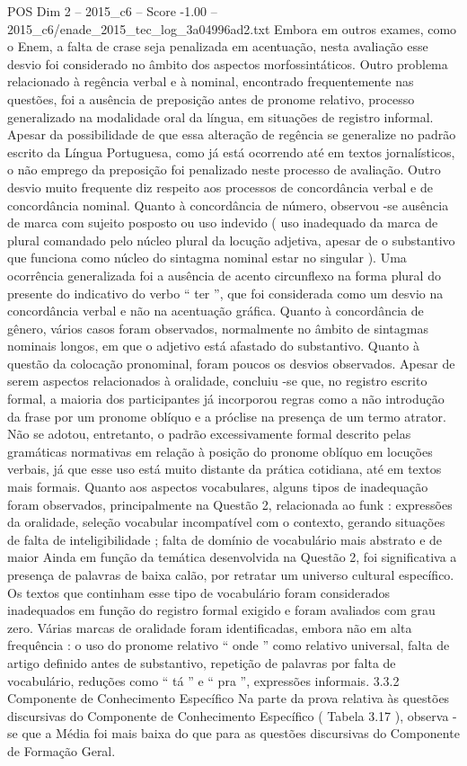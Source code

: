 \begin{textsample}{POS Dim 2 – 2015\_c6 – Score -1.00 – 2015\_c6/enade\_2015\_tec\_log\_3a04996ad2.txt}
Embora em outros exames, como o Enem, a falta de crase seja penalizada em acentuação, nesta avaliação esse desvio foi considerado no âmbito dos aspectos morfossintáticos.
Outro problema relacionado à regência verbal e à nominal, encontrado frequentemente nas questões, foi a ausência de preposição antes de pronome relativo, processo generalizado na modalidade oral da língua, em situações de registro informal.
Apesar da possibilidade de que essa alteração de regência se generalize no padrão escrito da Língua Portuguesa, como já está ocorrendo até em textos jornalísticos, o não emprego da preposição foi penalizado neste processo de avaliação.
Outro desvio muito frequente diz respeito aos processos de concordância verbal e de concordância nominal.
Quanto à concordância de número, observou -se ausência de marca com sujeito posposto ou uso indevido ( uso inadequado da marca de plural comandado pelo núcleo plural da locução adjetiva, apesar de o substantivo que funciona como núcleo do sintagma nominal estar no singular ).
Uma ocorrência generalizada foi a ausência de acento circunflexo na forma plural do presente do indicativo do verbo “ ter ”, que foi considerada como um desvio na concordância verbal e não na acentuação gráfica.
Quanto à concordância de gênero, vários casos foram observados, normalmente no âmbito de sintagmas nominais longos, em que o adjetivo está afastado do substantivo.
Quanto à questão da colocação pronominal, foram poucos os desvios observados.
Apesar de serem aspectos relacionados à oralidade, concluiu -se que, no registro escrito formal, a maioria dos participantes já incorporou regras como a não introdução da frase por um pronome oblíquo e a próclise na presença de um termo atrator.
Não se adotou, entretanto, o padrão excessivamente formal descrito pelas gramáticas normativas em relação à posição do pronome oblíquo em locuções verbais, já que esse uso está muito distante da prática cotidiana, até em textos mais formais.
Quanto aos aspectos vocabulares, alguns tipos de inadequação foram observados, principalmente na Questão 2, relacionada ao funk : expressões da oralidade, seleção vocabular incompatível com o contexto, gerando situações de falta de inteligibilidade ; falta de domínio de vocabulário mais abstrato e de maior Ainda em função da temática desenvolvida na Questão 2, foi significativa a presença de palavras de baixa calão, por retratar um universo cultural específico.
Os textos que continham esse tipo de vocabulário foram considerados inadequados em função do registro formal exigido e foram avaliados com grau zero.
Várias marcas de oralidade foram identificadas, embora não em alta frequência : o uso do pronome relativo “ onde ” como relativo universal, falta de artigo definido antes de substantivo, repetição de palavras por falta de vocabulário, reduções como “ tá ” e “ pra ”, expressões informais. 3.3.2 Componente de Conhecimento Específico Na parte da prova relativa às questões discursivas do Componente de Conhecimento Específico ( Tabela 3.17 ), observa -se que a Média foi mais baixa do que para as questões discursivas do Componente de Formação Geral.

\end{textsample}
